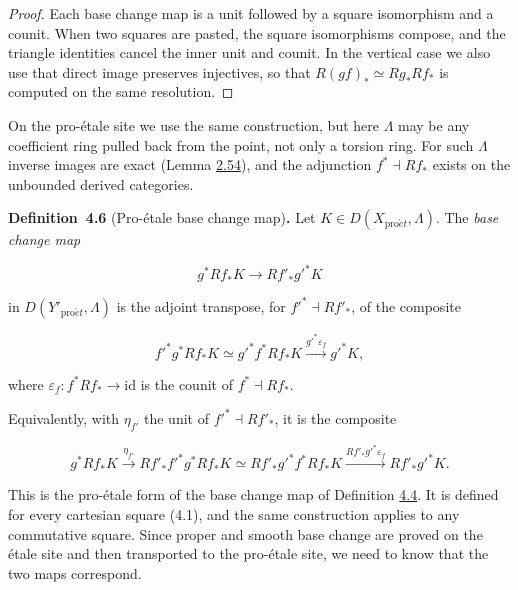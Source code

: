 \documentclass[11pt]{article}
\newenvironment{bpstatement}[2]{\par\addvspace{0.6\baselineskip}\noindent\textbf{#1}#2\textbf{.}\enspace\ignorespaces}
  {\par\addvspace{0.4\baselineskip}}
\begin{document}
\begin{proof}[{Proof}]\label{bp300}%
Each base change map is a unit followed by a square isomorphism and a counit. When two squares are pasted, the square isomorphisms compose, and the triangle identities cancel the inner unit and counit. In the vertical case we also use that direct image preserves injectives, so that \(R(gf)_*\simeq Rg_*Rf_*\) is computed on the same resolution.
\end{proof}

\label{bp301}%
On the pro-étale site we use the same construction, but here \(\Lambda\) may be any coefficient ring pulled back from the point, not only a torsion ring. For such \(\Lambda\) inverse images are exact (Lemma \hyperref[bp167]{2.54}), and the adjunction \(f^*\dashv Rf_*\) exists on the unbounded derived categories.

\label{bp302}%
\begin{bpstatement}{Definition~4.6}{ (Pro-étale base change map)}
Let \(K\in D(X_{\mathrm{pro}\acute{e}t},\Lambda)\). The \emph{base change map}

\[
g^*Rf_*K\longrightarrow Rf'_*g'^*K
\tag{4.5}
\]

in \(D(Y'_{\mathrm{pro}\acute{e}t},\Lambda)\) is the adjoint transpose, for \(f'^*\dashv Rf'_*\), of the composite

\[
f'^*g^*Rf_*K\simeq g'^*f^*Rf_*K
\xrightarrow{g'^*\varepsilon_f}g'^*K,
\]

where \(\varepsilon_f:f^*Rf_*\to\mathrm{id}\) is the counit of \(f^*\dashv Rf_*\).
\end{bpstatement}

\label{bp303}%
Equivalently, with \(\eta_{f'}\) the unit of \(f'^*\dashv Rf'_*\), it is the composite

\[
g^*Rf_*K\xrightarrow{\eta_{f'}}
Rf'_*f'^*g^*Rf_*K\simeq Rf'_*g'^*f^*Rf_*K
\xrightarrow{Rf'_*g'^*\varepsilon_f}Rf'_*g'^*K.
\]

This is the pro-étale form of the base change map of Definition \hyperref[bp297]{4.4}. It is defined for every cartesian square (4.1), and the same construction applies to any commutative square. Since proper and smooth base change are proved on the étale site and then transported to the pro-étale site, we need to know that the two maps correspond.
\end{document}
